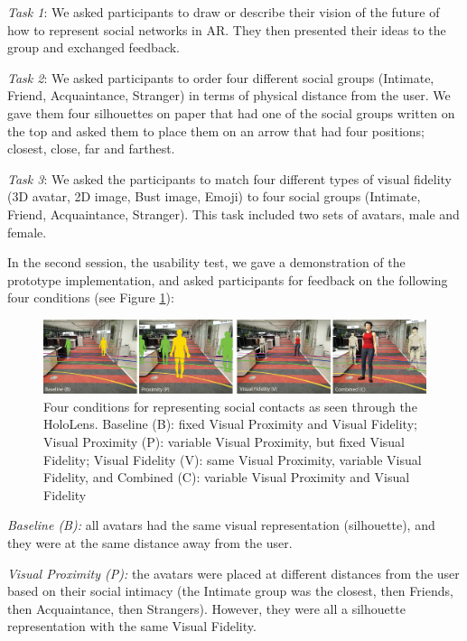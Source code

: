 \textit{Task 1}: We asked participants to draw or describe their vision of the future of how to represent social networks in AR. They then presented their ideas to the group and exchanged feedback.

\textit{Task 2}: We asked participants to order four different social groups (Intimate, Friend, Acquaintance, Stranger) in terms of physical distance from the user. We gave them four silhouettes on paper that had one of the social groups written on the top and asked them to place them on an arrow that had four positions; closest, close, far and farthest.

\textit{Task 3}: We asked the participants to match four different types of visual fidelity (3D avatar, 2D image, Bust image, Emoji) to four social groups (Intimate, Friend, Acquaintance, Stranger). This task included two sets of avatars, male and female.

In the second session, the usability test, we gave a demonstration of the prototype implementation, and asked participants for feedback on the following four conditions (see Figure \ref{fig:contacts:conditions}): 
\begin{figure}[h]
    \centering
    \includegraphics[width=\linewidth]{images/mgia17/conditions-transparent-background}
    \caption{Four conditions for representing social contacts as seen through the HoloLens. Baseline (B): fixed Visual Proximity and Visual Fidelity; Visual Proximity (P): variable Visual Proximity, but fixed Visual Fidelity; Visual Fidelity (V): same Visual Proximity, variable Visual Fidelity, and Combined (C): variable Visual Proximity and Visual Fidelity}
    \label{fig:contacts:conditions}
\end{figure}

\textit{Baseline (B):} all avatars had the same visual representation (silhouette), and they were at the same distance away from the user.

\textit{Visual Proximity (P):} the avatars were placed at different distances from the user based on their social intimacy (the Intimate group was the closest, then Friends, then Acquaintance, then Strangers). However, they were all a silhouette representation with the same Visual Fidelity.

